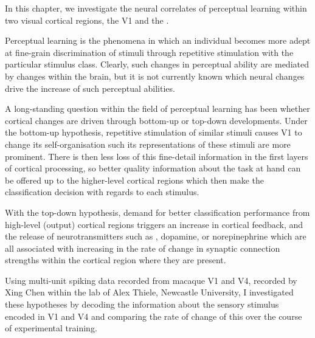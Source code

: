 In this chapter, we investigate the neural correlates of perceptual learning within two visual cortical regions, the \acf{V1} and the .

Perceptual learning is the phenomena in which an individual becomes more adept at fine-grain discrimination of stimuli through repetitive stimulation with the particular stimulus class.
Clearly, such changes in perceptual ability are mediated by changes within the brain, but it is not currently known which neural changes drive the increase of such perceptual abilities.

A long-standing question within the field of perceptual learning has been whether cortical changes are driven through bottom-up or top-down developments.
Under the bottom-up hypothesis, repetitive stimulation of similar stimuli causes \ac{V1} to change its self-organisation such its representations of these stimuli are more prominent.
There is then less loss of this fine-detail information in the first layers of cortical processing, so better quality information about the task at hand can be offered up to the higher-level cortical regions which then make the classification decision with regards to each stimulus.

With the top-down hypothesis, demand for better classification performance from high-level (output) cortical regions triggers an increase in cortical feedback, and the release of neurotransmitters such as , dopamine, or norepinephrine which are all associated with increasing in the rate of change in synaptic connection strengths within the cortical region where they are present.

Using multi-unit spiking data recorded from macaque \ac{V1} and \ac{V4}, recorded by Xing Chen within the lab of Alex Thiele, Newcastle University, I investigated these hypotheses by decoding the information about the sensory stimulus encoded in \ac{V1} and \ac{V4} and comparing the rate of change of this over the course of experimental training.
